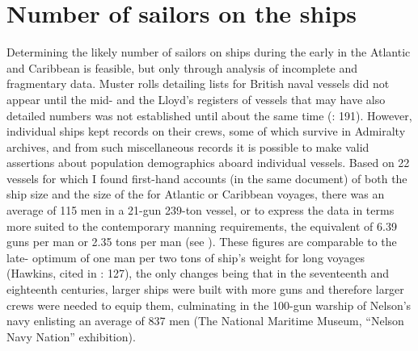 \section{{Number of sailors on the ships}}\label{sec:3.12}

  Determining the likely number of sailors on ships during the early  in the Atlantic and Caribbean is feasible, but only through analysis of incomplete and fragmentary data. Muster rolls detailing  lists for British naval vessels did not appear until the mid- \citep[125]{Litter1999} and the Lloyd’s registers of vessels that may have also detailed  numbers was not established until about the same time (\citealt{Litter1999}: 191). However, individual ships kept records on their crews, some of which survive in Admiralty archives, and from such miscellaneous records it is possible to make valid assertions about population demographics aboard individual vessels. Based on 22 vessels for which I found first-hand accounts (in the same document) of both the ship size and the size of the  for Atlantic or Caribbean voyages, there was an average of 115 men in a 21-gun 239-ton vessel, or to express the data in terms more suited to the contemporary manning requirements, the equivalent of 6.39 guns per man or 2.35 tons per man (see ). These figures are comparable to the late- optimum of one man per two tons of ship’s weight for long voyages (Hawkins, cited in \citealt{Bicheno2012}: 127), the only changes being that in the seventeenth and eighteenth centuries, larger ships were built with more guns and therefore larger crews were needed to equip them, culminating in the 100-gun warship of Nelson’s navy enlisting an average of 837 men (The National Maritime Museum, “Nelson Navy Nation” exhibition).

